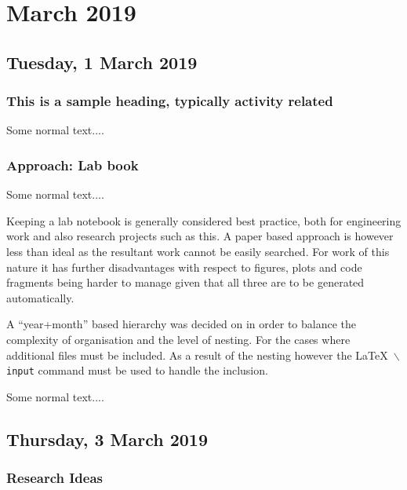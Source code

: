 \chapter[2019 March]{March 2019}

\section[2019/03/02]{Tuesday, 1 March 2019}
\label{sec:somewhere}

\subsection{This is a sample heading, typically activity related}

Some normal text....

\subsection{Approach: Lab book}

Some normal text....

\begin{slantnote}
  Keeping a lab notebook is generally considered best practice, both for
  engineering work and also research projects such as this. A paper based
  approach is however less than ideal as the resultant work cannot be
  easily searched. For work of this nature it has further disadvantages
  with respect to figures, plots and code fragments being harder to manage
  given that all three are to be generated automatically.

  A ``year+month'' based hierarchy was decided on in order to balance the
  complexity of organisation and the level of nesting. For the cases where
  additional files must be included. As a result of the nesting however the
  \LaTeX\ \texttt{$\backslash$input} command must be used to handle the
  inclusion.
\end{slantnote}

Some normal text....

\pendsign

\section[2019/03/03]{Thursday, 3 March 2019}

\subsection{Research Ideas}

